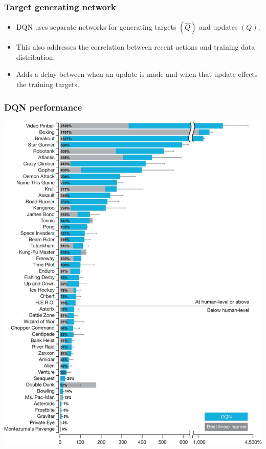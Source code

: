 \documentclass{beamer}
\begin{document}
\begin{frame}
  \frametitle{Target generating network}
  \begin{itemize}
    \item DQN uses separate networks for generating targets \((\hat{Q})\) and updates \((Q)\).
      \item This also addresses the correlation between recent actions and
        training data distribution.
        \item Adds a delay between when an update is made and when that update
          effects the training targets.
  \end{itemize}
\end{frame}

\begin{frame}
  \frametitle{DQN performance}
  \includegraphics[width=\textwidth]{result.jpg}
\end{frame}
\end{document}
